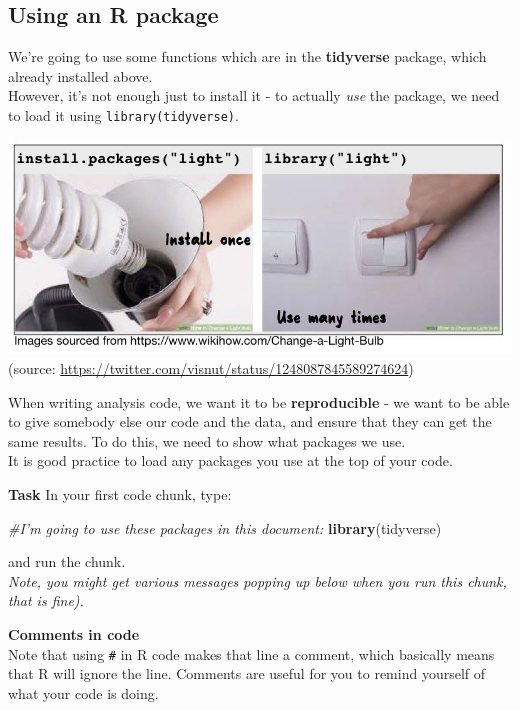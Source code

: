 \documentclass[]{book}
\newenvironment{Shaded}{\begin{snugshade}}{\end{snugshade}}
\newcommand{\CommentTok}[1]{\textcolor[rgb]{0.56,0.35,0.01}{\textit{#1}}}
\newcommand{\KeywordTok}[1]{\textcolor[rgb]{0.13,0.29,0.53}{\textbf{#1}}}
\newcommand{\NormalTok}[1]{#1}
\begin{document}
\hypertarget{using-an-r-package}{%
\subsection*{Using an R package}\label{using-an-r-package}}

We're going to use some functions which are in the \textbf{tidyverse} package, which already installed above.\\
However, it's not enough just to install it - to actually \emph{use} the package, we need to load it using \texttt{library(tidyverse)}.

\includegraphics{images/installing_intro/libraries.jpeg}
(source: \url{https://twitter.com/visnut/status/1248087845589274624})

When writing analysis code, we want it to be \textbf{reproducible} - we want to be able to give somebody else our code and the data, and ensure that they can get the same results. To do this, we need to show what packages we use.\\
It is good practice to load any packages you use at the top of your code.

\textbf{Task}
In your first code chunk, type:

\begin{Shaded}
\begin{Highlighting}[]
\CommentTok{#I'm going to use these packages in this document:}
\KeywordTok{library}\NormalTok{(tidyverse)}
\end{Highlighting}
\end{Shaded}

and run the chunk.\\
\emph{Note, you might get various messages popping up below when you run this chunk, that is fine).}

\textbf{Comments in code}\\
Note that using \texttt{\#} in R code makes that line a comment, which basically means that R will ignore the line. Comments are useful for you to remind yourself of what your code is doing.
\end{document}
